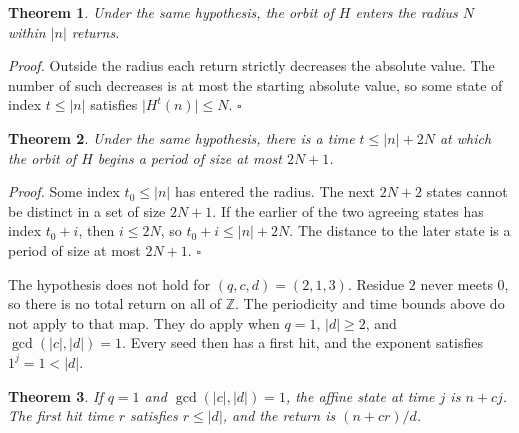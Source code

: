 \documentclass[11pt,letterpaper]{article}
\newtheorem{theorem}{Theorem}
\newenvironment{proof}{\noindent\textit{Proof.}}{\hfill\(\square\)}
\begin{document}
\begin{theorem}
\label{thm:entrytime}
Under the same hypothesis, the orbit of \(H\) enters the radius \(N\) within \(\lvert n\rvert\) returns.
\end{theorem}

\begin{proof}
Outside the radius each return strictly decreases the absolute value. The number of such decreases is at most the starting absolute value, so some state of index \(t\le\lvert n\rvert\) satisfies \(\lvert H^{t}(n)\rvert\le N\).
\end{proof}

\begin{theorem}
\label{thm:cycletime}
Under the same hypothesis, there is a time \(t\le\lvert n\rvert+2N\) at which the orbit of \(H\) begins a period of size at most \(2N+1\).
\end{theorem}

\begin{proof}
Some index \(t_{0}\le\lvert n\rvert\) has entered the radius. The next \(2N+2\) states cannot be distinct in a set of size \(2N+1\). If the earlier of the two agreeing states has index \(t_{0}+i\), then \(i\le 2N\), so \(t_{0}+i\le\lvert n\rvert+2N\). The distance to the later state is a period of size at most \(2N+1\).
\end{proof}

The hypothesis does not hold for \((q,c,d)=(2,1,3)\). Residue \(2\) never meets \(0\), so there is no total return on all of \(\mathbb{Z}\). The periodicity and time bounds above do not apply to that map. They do apply when \(q=1\), \(\lvert d\rvert\ge 2\), and \(\gcd(\lvert c\rvert,\lvert d\rvert)=1\). Every seed then has a first hit, and the exponent satisfies \(1^{j}=1<\lvert d\rvert\).

\begin{theorem}
\label{thm:unitoffset}
If \(q=1\) and \(\gcd(\lvert c\rvert,\lvert d\rvert)=1\), the affine state at time \(j\) is \(n+cj\). The first hit time \(r\) satisfies \(r\le\lvert d\rvert\), and the return is \((n+cr)/d\).
\end{theorem}
\end{document}
